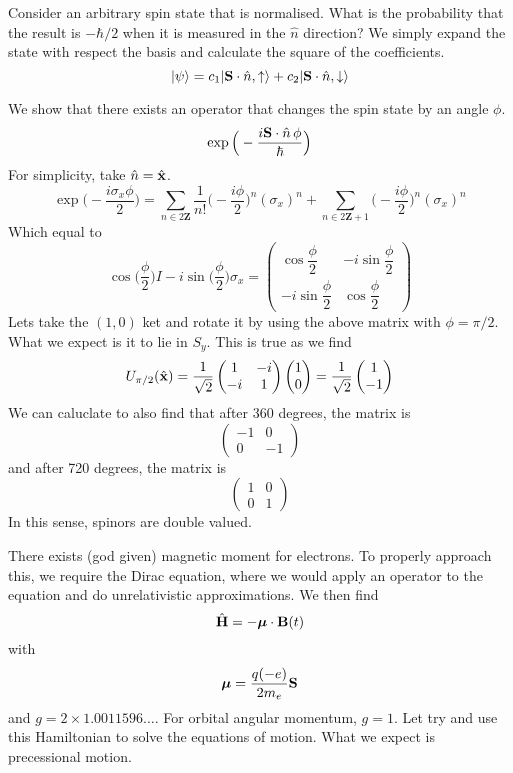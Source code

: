 \begin{rmk}
Consider an arbitrary spin state that is normalised. What is the probability that the result is $-\hbar /2$ when it is measured in the $\hat{n}$ direction? We simply expand the state with respect the basis and calculate the square of the coefficients.
\[|\psi \rangle =c_1|{\bf S}\cdot \hat{n},\uparrow\rangle +c_2|{\bf S}\cdot \hat{n},\downarrow\rangle \]
\end{rmk}
\vspace{2ex}
\begin{thm}
We show that there exists an operator that changes the spin state by an angle $\phi $.
\[\exp \Big(-\dfrac{i{\bf S}\cdot \hat{n}\,\phi }{\hbar }\Big)\]
For simplicity, take $\hat{n}=\hat{{\bf x}}$. 
\[\exp \Big(-\dfrac{i\sigma _{x}\phi }{2}\Big)=\sum _{n\in 2{\bm Z}}\dfrac{1}{n!}\Big(-\dfrac{i\phi }{2}\Big)^{n}(\sigma _{x})^{n}+\sum _{n\in 2{\bm Z}+1}\Big(-\dfrac{i\phi }{2}\Big)^{n}(\sigma _{x})^{n}\]
Which equal to 
\[\cos \Big(\dfrac{\phi }{2}\Big)I-i\sin \Big(\dfrac{\phi }{2}\Big)\sigma _{x}=\begin{pmatrix}
\cos \dfrac{\phi }{2}&-i\sin \dfrac{\phi }{2}\\
-i\sin \dfrac{\phi }{2}&\cos \dfrac{\phi }{2}
\end{pmatrix}
\]
Lets take the $(1,0)$ ket and rotate it by using the above matrix with $\phi =\pi /2$. What we expect is it to lie in $S_{y}$. This is true as we find
\[U_{\pi /2}(\hat{{\bf x}})=\dfrac{1}{\sqrt{2}}\begin{pmatrix}
1&-i\\-i&1
\end{pmatrix}\begin{pmatrix}
1\\0
\end{pmatrix}=\dfrac{1}{\sqrt{2}}\begin{pmatrix}
1\\-1
\end{pmatrix}
\]
We can caluclate to also find that after 360 degrees, the matrix is
\[\begin{pmatrix}
-1&0\\0&-1
\end{pmatrix}
\]
and after 720 degrees, the matrix is 
\[\begin{pmatrix}
1&0\\0&1
\end{pmatrix}
\]
In this sense, spinors are double valued.
\end{thm}
\vspace{2ex}
\begin{rmk}
There exists (god given) magnetic moment for electrons. To properly approach this, we require the Dirac equation, where we would apply an operator to the equation and do unrelativistic approximations. We then find
\[\hat{{\bf H}}=-{\bm \mu } \cdot {\bf B}(t)\]
with
\[{\bm \mu } =\dfrac{q(-e)}{2m_{e}}{\bf S}\]
and $g=2\times 1.0011596\ldots $. For orbital angular momentum, $g=1$. Let try and use this Hamiltonian to solve the equations of motion. What we expect is precessional motion.
\end{rmk}
